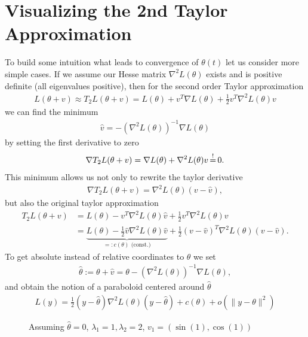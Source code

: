 \section{Visualizing the 2nd Taylor Approximation}\label{sec: visualize gd}

To build some intuition what leads to convergence of \(\theta(t)\) let us
consider more simple cases. If we assume our Hesse matrix \(\nabla^2
L(\theta)\) exists and is positive definite (all eigenvalues positive), then for
the second order Taylor approximation
%
\begin{align*}
	L(\theta+v) \approx T_2L(\theta+v)
	= L(\theta) + v^T \nabla L(\theta) + \tfrac12 v^T \nabla^2 L(\theta) v
\end{align*}
%
we can find the minimum 
\begin{align*}
	\hat{v} = -(\nabla^2 L(\theta))^{-1}\nabla L(\theta)
\end{align*}
by setting the first derivative to zero
%
\begin{align*}
	\nabla T_2L(\theta+v) = \nabla L(\theta) + \nabla^2L(\theta) v \xeq{!} 0.
\end{align*}
%
This minimum allows us not only to rewrite the taylor derivative
%
\begin{align*}
	\nabla T_2L(\theta+v) = \nabla^2 L(\theta)(v-\hat{v}),
\end{align*}
%
but also the original taylor approximation
%
\begin{align*}
	T_2L(\theta+v)
	&= L(\theta) - v^T \nabla^2 L(\theta) \hat{v} + \tfrac12 v^T \nabla^2 L(\theta) v \\
	&= \underbrace{L(\theta) - \tfrac12 \hat{v} \nabla^2 L(\theta) \hat{v}}_{=: c(\theta) \text{ (const.)}}
	+ \tfrac12 (v-\hat{v})^T \nabla^2 L(\theta)(v-\hat{v}).
\end{align*}
%
To get absolute instead of relative coordinates to \(\theta\) we set
%
\begin{align*}
	\hat{\theta} := \theta + \hat{v} = \theta -(\nabla^2 L(\theta))^{-1}\nabla L(\theta),
\end{align*}
%
and obtain the notion of a paraboloid centered around \(\hat{\theta}\)
%
\begin{align}\label{paraboloid approximation of L}
	L(y) = \tfrac12 (y- \hat{\theta}) \nabla^2 L(\theta) (y-\hat{\theta}) + c(\theta) + o(\|y-\theta\|^2)
\end{align}
%
\begin{wrapfigure}{O}{0.65\textwidth}
	\centering
	\def\svgwidth{0.65\textwidth}
	
	\caption{Assuming \(\hat{\theta}=0\), \(\lambda_1=1, \lambda_2=2\), \(v_1=(\sin(1), \cos(1))\)}
	\label{fig: 2d paraboloid}
\end{wrapfigure}
